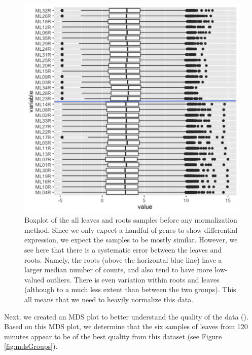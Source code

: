 \documentclass[11pt,a4paper,oldfontcommands,openany]{memoir}
\numberwithin{equation}{section} %
\begin{document}
\begin{figure}[H]
    \begin{framed}
    \centering
    \includegraphics[width=\textwidth]{needNorm}
    \end{framed}
    \caption{Boxplot of the all leaves and roots samples before any normalization method. Since we only expect a handful of genes to show differential expression, we expect the samples to be mostly similar. However, we see here that there is a systematic error between the leaves and roots. Namely, the roots (above the horizontal blue line) have a larger median number of counts, and also tend to have more low-valued outliers. There is even variation within roots and leaves (although to a much less extent than between the two groups). This all means that we need to heavily normalize this data.}
    \label{fig:needNorm}
\end{figure}

Next, we created an MDS plot to better understand the quality of the data (\citealt{limma}). Based on this MDS plot, we determine that the six samples of leaves from 120 minutes appear to be of the best quality from this dataset (see Figure \ref{fig:mdsGroups}).

\clearpage
\end{document}
